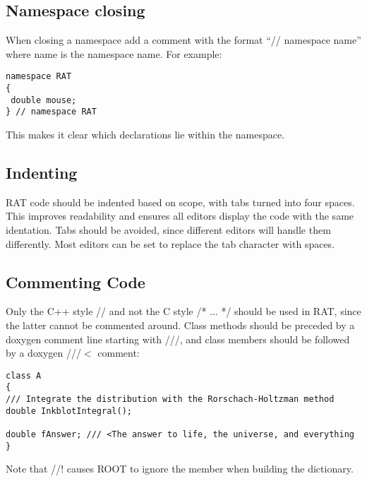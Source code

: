 \subsection{Namespace closing}
When closing a namespace add a comment with the format ``// namespace name'' where name is the namespace name. For example:
\begin{verbatim}
namespace RAT
{
 double mouse;
} // namespace RAT
\end{verbatim}

This makes it clear which declarations lie within the namespace.

\subsection{Indenting}
RAT code should be indented based on scope, with tabs turned into four spaces. This improves readability and ensures all editors display the code with the same identation. Tabs should be avoided, since different editors will handle them differently. Most editors can be set to replace the tab character with spaces.

\subsection{Commenting Code}
Only the C++ style // and not the C style /* ... */ should be used in RAT, since the latter cannot be commented around. Class methods should be preceded by a doxygen comment line starting with ///, and class members should be followed by a doxygen ///$<$ comment:
\begin{verbatim}
class A
{
/// Integrate the distribution with the Rorschach-Holtzman method
double InkblotIntegral();

double fAnswer; /// <The answer to life, the universe, and everything
}
\end{verbatim}

Note that //! causes ROOT to ignore the member when building the dictionary.

